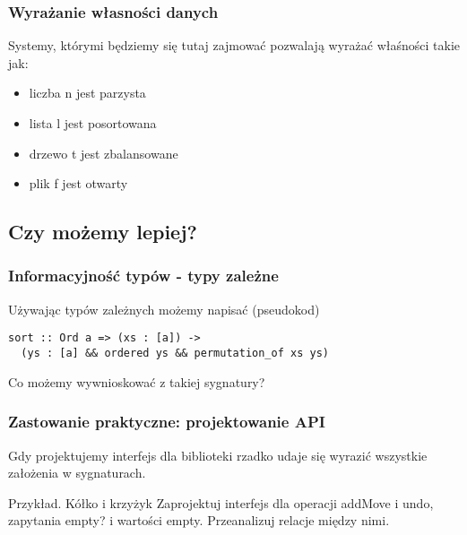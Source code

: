 \documentclass{beamer}
\begin{document}

\begin{frame}[fragile]
\frametitle{Wyrażanie własności danych}

Systemy, którymi będziemy się tutaj zajmować pozwalają
wyrażać właśności takie jak: 

\begin{itemize}
\item liczba n jest parzysta
\item lista l jest posortowana
\item drzewo t jest zbalansowane
\item plik f jest otwarty
\end{itemize}

\end{frame}


\subsection{Czy możemy lepiej?}

\begin{frame}[fragile]
\frametitle{Informacyjność typów - typy zależne}

Używając typów zależnych możemy napisać (pseudokod)

\begin{lstlisting}
sort :: Ord a => (xs : [a]) -> 
  (ys : [a] && ordered ys && permutation_of xs ys)
\end{lstlisting}


Co możemy wywnioskować z takiej sygnatury?


\end{frame}


\begin{frame}
\frametitle{Zastowanie praktyczne: projektowanie API}

Gdy projektujemy interfejs dla biblioteki 
rzadko udaje się wyrazić wszystkie założenia w sygnaturach.

\begin{block}{Przykład. Kółko i krzyżyk}
Zaprojektuj interfejs dla operacji addMove i undo, zapytania
empty? i wartości empty. Przeanalizuj relacje między nimi.
\end{block}

\end{frame}
\end{document}
